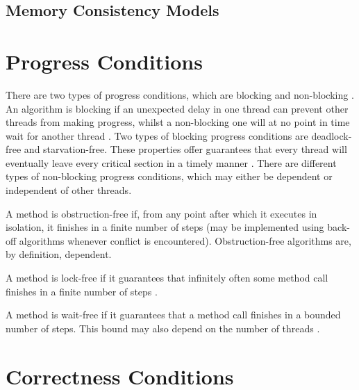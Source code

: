 \subsection{Memory Consistency Models}

\section{Progress Conditions}
There are two types of progress conditions, which are blocking and non-blocking \cite[Chapter~3.7]{herlihy2020art}. An algorithm is blocking if an unexpected delay in one thread can prevent other threads from making progress, whilst a non-blocking one will at no point in time wait for another thread \cite[Chapter~3.7]{herlihy2020art}. Two types of blocking progress conditions are deadlock-free and starvation-free. These properties offer guarantees that every thread will eventually leave every critical section in a timely manner \cite[Chapter~3.7.1]{herlihy2020art}. There are different types of non-blocking progress conditions, which may either be dependent or independent of other threads. 

A method is obstruction-free if, from any point after which it executes in isolation, it finishes in a finite number of steps (may be implemented using back-off algorithms whenever conflict is encountered)\cite{herlihy2020art,herlihy2003obstruction}. Obstruction-free algorithms are, by definition, dependent.

A method is lock-free if it guarantees that infinitely often some method call finishes in a finite number of steps \cite{herlihy2020art}.

A method is wait-free if it guarantees that a method call finishes in a bounded number of steps. This bound may also depend on the number of threads \cite{herlihy2020art}.

\section{Correctness Conditions}

